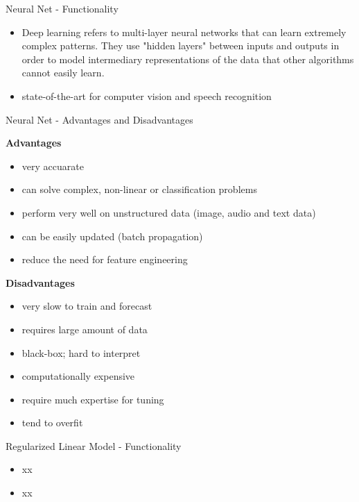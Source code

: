 \documentclass[11pt,compress,t,notes=noshow, xcolor=table]{beamer}
\begin{document}
\begin{frame}{Neural Net - Functionality}

\begin{itemize}
\item Deep learning refers to multi-layer neural networks that can learn extremely complex patterns. They use "hidden layers" between inputs and outputs in order to model intermediary representations of the data that other algorithms cannot easily learn.
\item state-of-the-art for computer vision and speech recognition
\end{itemize}


\end{frame}

\begin{frame}{Neural Net  - Advantages and Disadvantages}

\textbf{Advantages}
\begin{itemize}
\item very accuarate
\item can solve complex, non-linear or classification problems 
\item perform very well on unstructured data (image, audio and text data)
\item can be easily updated (batch propagation)
\item reduce the need for feature engineering

\end{itemize}


\textbf{Disadvantages}
\begin{itemize}
\item very slow to train and forecast
\item requires large amount of data
\item black-box; hard to interpret
\item computationally expensive
\item require much expertise for tuning
\item tend to overfit
\end{itemize}
\end{frame}



\begin{frame}{Regularized Linear Model - Functionality}

\begin{itemize}
\item xx
\item xx
\end{itemize}


\end{frame}
\end{document}
